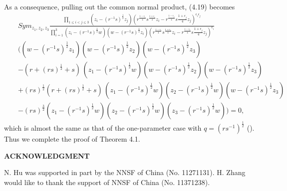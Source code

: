 \documentclass{amsproc}
\theoremstyle{remark}
\numberwithin{equation}{section}
\begin{document}
As a consequence, pulling out the common normal product, (4.19) becomes
\begin{eqnarray*}
&&Sym_{z_1,
z_2,z_3}\frac{\prod_{1\leqslant i<j\leqslant 3}(z_i-(r^{-1}s)^{\frac{1}{2}}z_j)
(r^{\frac{1-{\epsilon}_i}{4}}s^{\frac{1+{\epsilon}_i}{4}}z_i-r^{\frac{1-{\epsilon}_j}{4}}s{\frac{1+{\epsilon}_j}{4}}z_j)^{{\epsilon}_i{\epsilon}_j}}
{\prod_{i=1}^{3}(z_i-(r^{-1}s)^{\frac{1}{2}}w)(w-(r^{-1}s)^{\frac{1}{2}}z_i)
(r^{\frac{1-{\epsilon}_i}{4}}s^{\frac{1+{\epsilon}_i}{4}}z_i-r^{\frac{1-{\epsilon}_j}{4}}s{\frac{1+{\epsilon}_j}{4}}z_j)^{{\epsilon}_i}}\\
&&\Big((w-(r^{-1}s)^{\frac{1}{2}}z_1)(w-(r^{-1}s)^{\frac{1}{2}}z_2)(w-(r^{-1}s)^{\frac{1}{2}}z_3)\\
&&-(r{+}(rs)^{\frac{1}{2}}+s)\,(z_1-(r^{-1}s)^{\frac{1}{2}}w)(w-(r^{-1}s)^{\frac{1}{2}}z_2)(w-(r^{-1}s)^{\frac{1}{2}}z_3)\\
&&+(rs)^{\frac{1}{2}}(r{+}(rs)^{\frac{1}{2}}+s)\,(z_1-(r^{-1}s)^{\frac{1}{2}}w)(z_2-(r^{-1}s)^{\frac{1}{2}}w)(w-(r^{-1}s)^{\frac{1}{2}}z_3)\\
&&-(rs)^{\frac{3}{2}}(z_1-(r^{-1}s)^{\frac{1}{2}}w)(z_2-(r^{-1}s)^{\frac{1}{2}}w)(z_3-(r^{-1}s)^{\frac{1}{2}}w) \Big)=0,
\end{eqnarray*}
which is almost the same as that of the one-parameter case with $q=(rs^{-1})^\frac{1}{2}$ (\cite{JKM2}). 
Thus we complete the proof of Theorem 4.1.

\medskip

\vskip30pt \centerline{\bf ACKNOWLEDGMENT}

\bigskip
N. Hu was supported in part by the NNSF of China (No. 11271131).  H. Zhang would
like to thank the support of NNSF of China (No. 11371238).

\bigskip
\end{document}
